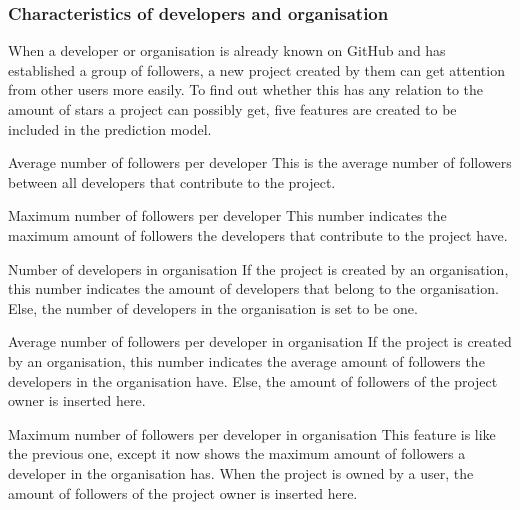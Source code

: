     \subsubsection{Characteristics of developers and organisation}
    When a developer or organisation is already known on GitHub and has established a group of followers, a new project created by them can get attention from other users more easily.
    To find out whether this has any relation to the amount of stars a project can possibly get, five features are created to be included in the prediction model.
    \begin{LaTeXdescription}
        \item[Average number of followers per developer]
        This is the average number of followers between all developers that contribute to the project.
        \item[Maximum number of followers per developer]
        This number indicates the maximum amount of followers the developers that contribute to the project have.
        \item[Number of developers in organisation]
        If the project is created by an organisation, this number indicates the amount of developers that belong to the organisation. Else, the number of developers in the organisation is set to be one.
        \item[Average number of followers per developer in organisation]
        If the project is created by an organisation, this number indicates the average amount of followers the developers in the organisation have. Else, the amount of followers of the project owner is inserted here.
        \item[Maximum number of followers per developer in organisation]
        This feature is like the previous one, except it now shows the maximum amount of followers a developer in the organisation has. When the project is owned by a user, the amount of followers of the project owner is inserted here.
    \end{LaTeXdescription}\hspace*{\fill}




